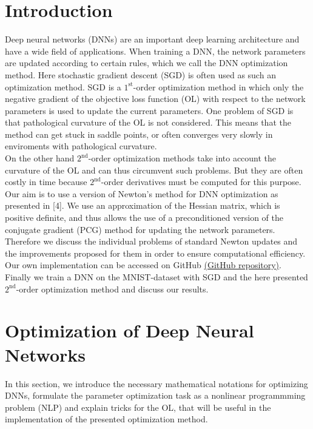 \documentclass[conference]{IEEEtran}
\begin{document}
	\section{Introduction} 
	\noindent
	Deep neural networks (DNNs) are an important deep learning architecture and have a wide field of applications. When training a DNN, the network parameters are updated according to certain rules, which we call the DNN optimization method. Here stochastic gradient descent (SGD) is often used as such an optimization method. SGD is a $1^{\text{st}}$-order optimization method in which only the negative gradient of the objective loss function (OL) with respect to the network parameters is used to update the current parameters. One problem of SGD is that pathological curvature of the OL is not considered. This means that the method can get stuck in saddle points, or often converges very slowly in enviroments with pathological curvature.\\
	On the other hand $2^{\text{nd}}$-order optimization methods take into account the curvature of the OL and can thus circumvent such problems. But they are often costly in time because $2^{\text{nd}}$-order derivatives must be computed for this purpose.\\
	Our aim is to use a version of Newton's method for DNN optimization as presented in [4]. We use an approximation of the Hessian matrix, which is positive definite, and thus allows the use of a preconditioned version of the conjugate gradient (PCG) method for updating the network parameters. Therefore we discuss the individual problems of standard Newton updates and the improvements proposed for them in order to ensure computational efficiency. Our own implementation can be accessed on GitHub \href{https://github.com/NiklasBrunn/Hessian_Free_Optimization_of_Deep_Neural_Networks}{(GitHub repository)}.\\ 
	Finally we train a DNN on the MNIST-dataset with SGD and the here presented $2^{\text{nd}}$-order optimization method and discuss our results.
	
	
	\section{Optimization of Deep Neural Networks}
	\noindent
	In this section, we introduce the necessary mathematical notations for optimizing DNNs, formulate the parameter optimization task as a nonlinear programmming problem (NLP) and explain tricks for the OL, that will be useful in the implementation of the presented optimization method.
	
\end{document}
